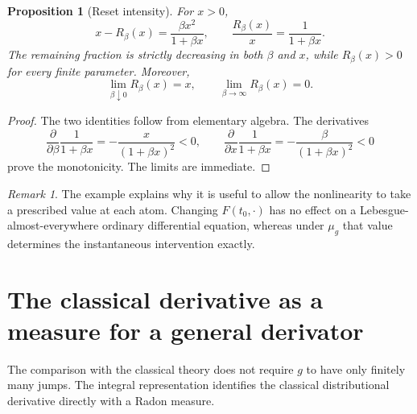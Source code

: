\documentclass[preprint,12pt]{elsarticle}
\newtheorem{proposition}[theorem]{Proposition}
\theoremstyle{definition}
\theoremstyle{remark}
\newtheorem{remark}[theorem]{Remark}
\begin{document}
\begin{proposition}[Reset intensity]\label{prop:logistic-reset-strength}
For $x>0$,
\[
 x-R_\beta(x)=\frac{\beta x^2}{1+\beta x},
 \qquad
 \frac{R_\beta(x)}x=\frac1{1+\beta x}.
\]
The remaining fraction is strictly decreasing in both $\beta$ and $x$, while $R_\beta(x)>0$ for every finite parameter. Moreover,
\[
 \lim_{\beta\downarrow0}R_\beta(x)=x,
 \qquad
 \lim_{\beta\to\infty}R_\beta(x)=0.
\]
\end{proposition}

\begin{proof}
The two identities follow from elementary algebra. The derivatives
\[
 \frac{\partial}{\partial\beta}\frac1{1+\beta x}
 =-\frac{x}{(1+\beta x)^2}<0,
 \qquad
 \frac{\partial}{\partial x}\frac1{1+\beta x}
 =-\frac{\beta}{(1+\beta x)^2}<0
\]
prove the monotonicity. The limits are immediate.
\end{proof}

\begin{remark}
The example explains why it is useful to allow the nonlinearity to take a prescribed value at each atom. Changing $F(t_0,\cdot)$ has no effect on a Lebesgue-almost-everywhere ordinary differential equation, whereas under $\mu_g$ that value determines the instantaneous intervention exactly.
\end{remark}

\section{The classical derivative as a measure for a general derivator}\label{sec:general-measure}

The comparison with the classical theory does not require $g$ to have only finitely many jumps. The integral representation identifies the classical distributional derivative directly with a Radon measure.
\end{document}
